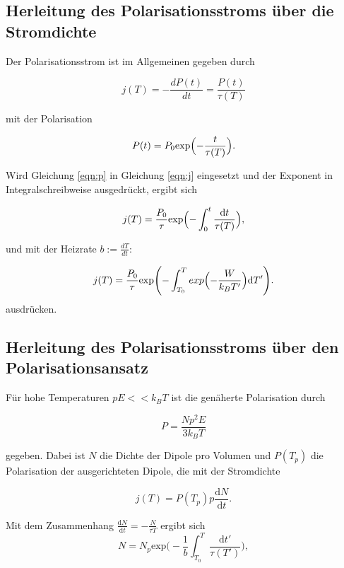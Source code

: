 \subsection{Herleitung des Polarisationsstroms über die Stromdichte}
Der Polarisationsstrom ist im Allgemeinen gegeben durch

\begin{equation}
    \label{eqn:j}
    j(T) = -\frac{dP(t)}{dt} = \frac{P(t)}{\tau(T)}
\end{equation}

\noindent
mit der Polarisation 

\begin{equation}
    \label{eqn:p}
    P(t) = P_0 \text{exp} \Bigl( - \frac{t}{\tau(T)} \Bigr).
\end{equation}

\noindent
Wird Gleichung \ref{eqn:p} in Gleichung \ref{eqn:j} eingesetzt und der Exponent in Integralschreibweise ausgedrückt, ergibt sich

\begin{equation}
    j(T) = \frac{P_0}{\tau} \text{exp} \Bigl( - \int_0^t \frac{\text{d}t}{\tau(T)} \Bigr),    
\end{equation} 

und mit der Heizrate $b := \frac{dT}{dt}$:

\begin{equation}
    j(T) = \frac{P_0}{\tau} \text{exp} \Biggl( - \int_{T_0}^T exp \Bigl( -\frac{W}{k_B T'} \Bigr) \text{d}T' \Biggr).
\end{equation}
\noindent
ausdrücken.


\subsection{Herleitung des Polarisationsstroms über  den Polarisationsansatz}
Für hohe Temperaturen $p E << k_B T $ ist die genäherte Polarisation durch 

\begin{equation}
    P = \frac{N p^2 E}{3 k_B T} 
\end{equation}

\noindent
gegeben. Dabei ist $N$ die Dichte der Dipole pro Volumen und $P(T_p)$ die Polarisation der ausgerichteten Dipole, die mit der Stromdichte

\begin{equation}
    j(T) = P(T_p) p \frac{\text{d}N}{\text{d}t} .
\end{equation}

\noindent
Mit dem Zusammenhang $\frac{\text{d}N}{\text{d}t} = -\frac{N}{\tau{T}}$ ergibt sich
\begin{equation}
    N = N_p \text{exp} \Biggl( -\frac{1}{b} \int_{T_0}^{T} \frac{\text{d}t'}{\tau(T')} \Biggr),  
\end{equation}

